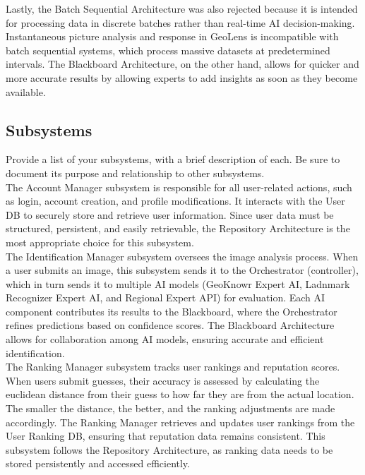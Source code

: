 \documentclass[]{article}
\begin{document}
\noindent Lastly, the Batch Sequential Architecture was also rejected because it is intended for processing data in discrete batches rather than real-time AI decision-making. Instantaneous picture analysis and response in GeoLens is incompatible with batch sequential systems, which process massive datasets at predetermined intervals. The Blackboard Architecture, on the other hand, allows for quicker and more accurate results by allowing experts to add insights as soon as they become available.\\


\subsection{Subsystems}
\label{sub:subsystems}
 \noindent Provide a list of your subsystems, with a brief description of each. Be sure to document its purpose and relationship to other subsystems.\\

 \noindent The Account Manager subsystem is responsible for all user-related actions, such as login, account creation, and profile modifications. It interacts with the User DB to securely store and retrieve user information. Since user data must be structured, persistent, and easily retrievable, the Repository Architecture is the most appropriate choice for this subsystem. \\

\noindent The Identification Manager subsystem oversees the image analysis process. When a user submits an image, this subsystem sends it to the Orchestrator (controller), which in turn sends it to multiple AI models (GeoKnowr Expert AI, Ladnmark Recognizer Expert AI, and Regional Expert API) for evaluation. Each AI component contributes its results to the Blackboard, where the Orchestrator refines predictions based on confidence scores. The Blackboard Architecture allows for collaboration among AI models, ensuring accurate and efficient identification. \\

\noindent The Ranking Manager subsystem tracks user rankings and reputation scores. When users submit guesses, their accuracy is assessed by calculating the euclidean distance from their guess to how far they are from the actual location. The smaller the distance, the better, and the ranking adjustments are made accordingly. The Ranking Manager retrieves and updates user rankings from the User Ranking DB, ensuring that reputation data remains consistent. This subsystem follows the Repository Architecture, as ranking data needs to be stored persistently and accessed efficiently.
\end{document}
